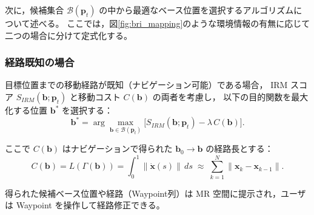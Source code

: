 \documentclass[../../main.tex]{subfiles} %
\begin{document}


次に，候補集合 $\mathcal{B}(\mathbf{p}_t)$ の中から最適なベース位置を選択するアルゴリズムについて述べる。
ここでは，図\ref{fig:bri_mapping}のような環境情報の有無に応じて二つの場合に分けて定式化する。

\subsubsection{経路既知の場合}
目標位置までの移動経路が既知（ナビゲーション可能）である場合，
IRM スコア $S_{IRM}(\mathbf{b}; \mathbf{p}_t)$ と移動コスト $C(\mathbf{b})$ の両者を考慮し，
以下の目的関数を最大化する位置 $\mathbf{b}^*$ を選択する：
\begin{equation}
\mathbf{b}^* = \arg\max_{\mathbf{b} \in \mathcal{B}(\mathbf{p}_t)}
\Big[ S_{IRM}(\mathbf{b}; \mathbf{p}_t) - \lambda \, C(\mathbf{b}) \Big].
\label{eq:bri_known}
\end{equation}

ここで $C(\mathbf{b})$ はナビゲーションで得られた
$\mathbf{b}_0\!\to\!\mathbf{b}$ の経路長とする：
\[
C(\mathbf{b})=L(\Gamma(\mathbf{b}))=\int_{0}^{1}\!\bigl\|\dot{\mathbf{x}}(s)\bigr\|\,ds
\;\approx\;\sum_{k=1}^{N}\bigl\|\mathbf{x}_k-\mathbf{x}_{k-1}\bigr\|.
\]

得られた候補ベース位置や経路（Waypoint列）は MR 空間に提示され，ユーザは Waypoint を操作して経路修正できる。
\end{document}
